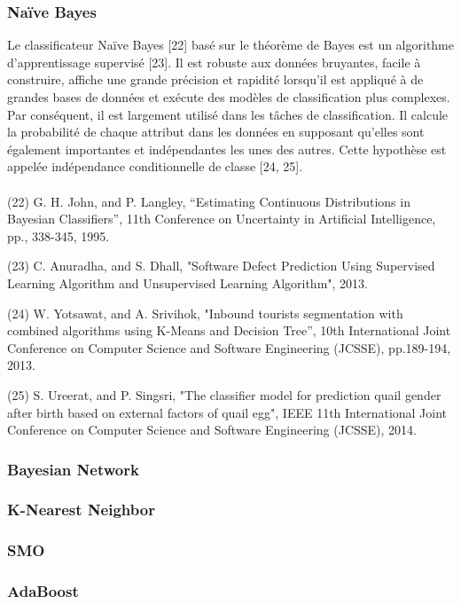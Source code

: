 \subsubsection{Naïve Bayes}
Le classificateur Naïve Bayes [22] basé sur le théorème de Bayes est un algorithme d'apprentissage supervisé [23]. Il est robuste aux données bruyantes, facile à construire, affiche une grande précision et rapidité lorsqu'il est appliqué à de grandes bases de données et exécute des modèles de classification plus complexes. Par conséquent, il est largement utilisé dans les tâches de classification. Il calcule la probabilité de chaque attribut dans les données en supposant qu'elles sont également importantes et indépendantes les unes des autres. Cette hypothèse est appelée indépendance conditionnelle de classe [24, 25].
\\
\\
(22) G. H. John, and P. Langley, “Estimating Continuous Distributions in Bayesian Classifiers”, 11th Conference on Uncertainty in Artificial Intelligence, pp., 338-345, 1995.

(23) C. Anuradha, and S. Dhall, "Software Defect Prediction Using Supervised Learning Algorithm and Unsupervised Learning Algorithm", 2013.

(24) W. Yotsawat, and A. Srivihok, "Inbound tourists segmentation with combined algorithms using K-Means and Decision Tree”, 10th International Joint Conference on Computer Science and Software Engineering (JCSSE), pp.189-194, 2013.

(25) S. Ureerat, and P. Singsri, "The classifier model for prediction quail gender after birth based on external factors of quail egg", IEEE 11th International Joint Conference on Computer Science and Software Engineering (JCSSE), 2014.

\subsubsection{Bayesian Network}
\subsubsection{K-Nearest Neighbor}
\subsubsection{SMO}
\subsubsection{AdaBoost}
